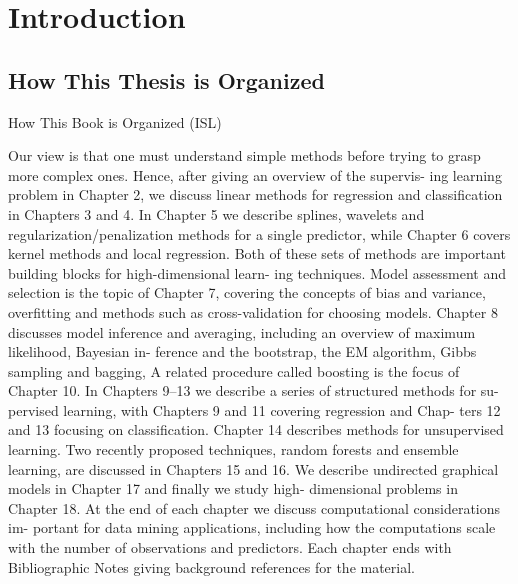 \section{Introduction}\label{sec:Introduction}


\subsection{How This Thesis is Organized}

How This Book is Organized (ISL)

Our view is that one must understand simple methods before trying to grasp more complex ones. Hence, after giving an overview of the supervis- ing learning problem in Chapter 2, we discuss linear methods for regression and classification in Chapters 3 and 4. In Chapter 5 we describe splines, wavelets and regularization/penalization methods for a single predictor, while Chapter 6 covers kernel methods and local regression. Both of these sets of methods are important building blocks for high-dimensional learn- ing techniques. Model assessment and selection is the topic of Chapter 7, covering the concepts of bias and variance, overfitting and methods such as cross-validation for choosing models. Chapter 8 discusses model inference and averaging, including an overview of maximum likelihood, Bayesian in- ference and the bootstrap, the EM algorithm, Gibbs sampling and bagging, A related procedure called boosting is the focus of Chapter 10.
In Chapters 9–13 we describe a series of structured methods for su- pervised learning, with Chapters 9 and 11 covering regression and Chap- ters 12 and 13 focusing on classification. Chapter 14 describes methods for unsupervised learning. Two recently proposed techniques, random forests and ensemble learning, are discussed in Chapters 15 and 16. We describe undirected graphical models in Chapter 17 and finally we study high- dimensional problems in Chapter 18.
At the end of each chapter we discuss computational considerations im- portant for data mining applications, including how the computations scale with the number of observations and predictors. Each chapter ends with Bibliographic Notes giving background references for the material.